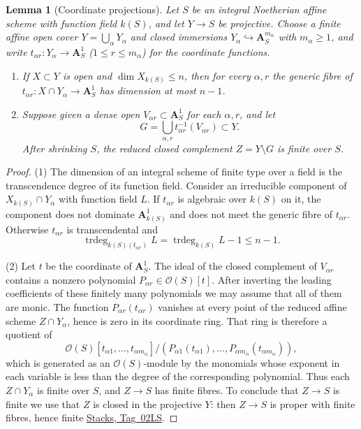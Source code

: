 \documentclass[11pt,a4paper]{article}
\numberwithin{equation}{section}
\newtheorem{lemma}[theorem]{Lemma}
\theoremstyle{definition}
\theoremstyle{remark}
\newcommand{\stacks}[1]{\href{https://stacks.math.columbia.edu/tag/#1}{\textnormal{Stacks, Tag~#1}}}
\begin{document}
\begin{lemma}[Coordinate projections]
\label{b:lem:geo-coordinates}
Let \(S\) be an integral Noetherian affine scheme with function field
\(k(S)\), and let \(Y\to S\) be projective. Choose a finite affine open
cover \(Y=\bigcup_\alpha Y_\alpha\) and closed immersions
\(Y_\alpha\hookrightarrow\mathbf A^{m_\alpha}_S\) with
\(m_\alpha\geq1\), and write \(t_{\alpha r}:Y_\alpha\to\mathbf A^1_S\)
(\(1\le r\le m_\alpha\)) for the coordinate functions.
\begin{enumerate}
\item If \(X\subset Y\) is open and \(\dim X_{k(S)}\leq n\), then for
every \(\alpha,r\) the generic fibre of
\(t_{\alpha r}:X\cap Y_\alpha\to\mathbf A^1_S\) has dimension at most
\(n-1\).
\item Suppose given a dense open \(V_{\alpha r}\subset\mathbf A^1_S\) for
each \(\alpha,r\), and let
\[
 G=\bigcup_{\alpha,r}
     t_{\alpha r}^{-1}(V_{\alpha r})\subset Y.
\]
After shrinking \(S\), the reduced closed complement \(Z=Y\setminus G\)
is finite over \(S\).
\end{enumerate}
\end{lemma}

\begin{proof}
(1) The dimension of an integral scheme of finite type over a field is
the transcendence degree of its function field. Consider an irreducible
component of \(X_{k(S)}\cap Y_\alpha\) with function field \(L\). If
\(t_{\alpha r}\) is algebraic over \(k(S)\) on it, the component does
not dominate \(\mathbf A^1_{k(S)}\) and does not meet the generic fibre
of \(t_{\alpha r}\). Otherwise \(t_{\alpha r}\) is transcendental and
\[
 \operatorname{trdeg}_{k(S)(t_{\alpha r})}L
      =\operatorname{trdeg}_{k(S)} L-1\leq n-1.
\]

(2) Let \(t\) be the coordinate of \(\mathbf A^1_S\). The ideal of the
closed complement of \(V_{\alpha r}\) contains a nonzero polynomial
\(P_{\alpha r}\in\mathcal O(S)[t]\). After inverting the leading
coefficients of these finitely many polynomials we may assume that all
of them are monic. The function \(P_{\alpha r}(t_{\alpha r})\) vanishes
at every point of the reduced affine scheme \(Z\cap Y_\alpha\), hence is
zero in its coordinate ring. That ring is therefore a quotient of
\[
 \mathcal O(S)[t_{\alpha1},\ldots,t_{\alpha m_\alpha}]/
       (P_{\alpha1}(t_{\alpha1}),\ldots,
                         P_{\alpha m_\alpha}(t_{\alpha m_\alpha})),
                                                               \tag{G20}
\]
which is generated as an \(\mathcal O(S)\)-module by the monomials whose
exponent in each variable is less than the degree of the corresponding
polynomial. Thus each \(Z\cap Y_\alpha\) is finite over \(S\), and
\(Z\to S\) has finite fibres. To conclude that \(Z\to S\) is finite we
use that \(Z\) is closed in the projective \(Y\): then \(Z\to S\) is
proper with finite fibres, hence finite \stacks{02LS}.
\end{proof}
\end{document}
